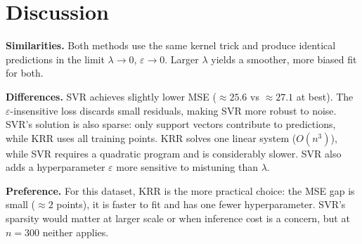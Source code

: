 \documentclass[fleqn,moreauthors,10pt]{ds_report}
\begin{document}
\section*{Discussion}

\textbf{Similarities.} Both methods use the same kernel trick and produce identical predictions in the limit $\lambda \to 0$, $\varepsilon \to 0$. Larger $\lambda$ yields a smoother, more biased fit for both.

\textbf{Differences.} SVR achieves slightly lower MSE ($\approx 25.6$ vs $\approx 27.1$ at best). The $\varepsilon$-insensitive loss discards small residuals, making SVR more robust to noise. SVR's solution is also sparse: only support vectors contribute to predictions, while KRR uses all training points. KRR solves one linear system ($O(n^3)$), while SVR requires a quadratic program and is considerably slower. SVR also adds a hyperparameter $\varepsilon$ more sensitive to mistuning than $\lambda$.

\textbf{Preference.} For this dataset, KRR is the more practical choice: the MSE gap is small ($\approx 2$ points), it is faster to fit and has one fewer hyperparameter. SVR's sparsity would matter at larger scale or when inference cost is a concern, but at $n = 300$ neither applies.



\end{document}
